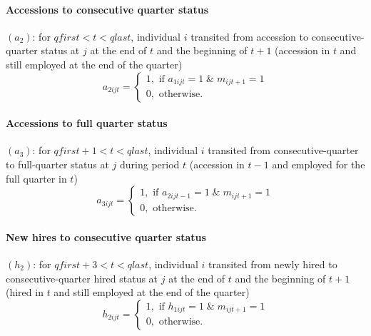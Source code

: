 \paragraph{Accessions to consecutive quarter status}


$\left( a_{2}\right) $: for $qfirst<t<qlast$, individual $i$ transited from
accession to consecutive-quarter status at $j$ at the end of $t$ and the
beginning of $t+1$ (accession in $t$ and still employed at the end of the
quarter)%
\begin{equation}
a_{2ijt}=\left\{ 
\begin{array}{l}
1,\text{ if }a_{1ijt}=1\;\&\;m_{ijt+1}=1 \\ 
0,\text{ otherwise.}%
\end{array}%
\right.  \label{eq:a2ijt}
\end{equation}

\paragraph{Accessions to full quarter status}


$\left( a_{3}\right) $: for $qfirst+1<t<qlast$, individual $i$ transited
from consecutive-quarter to full-quarter status at $j$ during period $t$
(accession in $t-1$ and employed for the full quarter in $t$)%
\begin{equation}
a_{3ijt}=\left\{ 
\begin{array}{l}
1,\text{ if }a_{2ijt-1}=1\;\&\;m_{ijt+1}=1 \\ 
0,\text{ otherwise.}%
\end{array}%
\right.  \label{eq:a3ijt}
\end{equation}

\paragraph{New hires to consecutive quarter status}


$\left( h_{2}\right) $: for $qfirst+3<t<qlast$, individual $i$ transited
from newly hired to consecutive-quarter hired status at $j$ at the end of $t$
and the beginning of $t+1$ (hired in $t$ and still employed at the end of
the quarter)%
\begin{equation}
h_{2ijt}=\left\{ 
\begin{array}{l}
1,\text{ if }h_{1ijt}=1\;\&\;m_{ijt+1}=1 \\ 
0,\text{ otherwise.}%
\end{array}%
\right.  \label{eq:h2ijt}
\end{equation}

